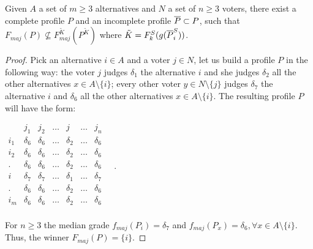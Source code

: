 \begin{proposition}
	\label{prop:notsamewinner}
	Given $A$ a set of $m\geq 3$ alternatives and $N$ a set of $n\geq3$ voters, there exist a complete profile $P$ and an incomplete profile $\overline{P} \subset P$, such that $F_{maj}(P) \nsubseteq F^{\tilde{K}}_{maj}(P^{\tilde{K}})$ \textemdash where $\tilde{K}=F^S_k(g(\overline{P}^S_i))$.
\end{proposition}
\begin{proof}
	Pick an alternative $i\in A$ and a voter $j \in N$, let us build a profile $P$ in the following way: the voter $j$ judges $\delta_1$ the alternative $i$ and she judges $\delta_2$ all the other alternatives $x \in A \setminus \{i\}$; every other voter $y\in N \setminus \{j\}$ judges $\delta_7$ the alternative $i$ and $\delta_6$ all the other alternatives $x \in A \setminus \{i\}$. The resulting profile $P$ will have the form:
	\begin{center}
		$
		\begin{array}{ccccccc}
			& j_1 & j_2 & \dots & j & \dots & j_n \\
			i_1 &	\delta_6 & \delta_6 & \dots & \delta_2 & \dots & \delta_6 \\
			i_2 &	\delta_6 & \delta_6 & \dots & \delta_2 & \dots & \delta_6 \\
			. &	\delta_6 & \delta_6 & \dots & \delta_2 & \dots & \delta_6 \\
			i &	\delta_7 & \delta_7 & \dots & \delta_1 & \dots & \delta_7 \\
			. &	\delta_6 & \delta_6 & \dots & \delta_2 & \dots & \delta_6 \\
			i_m &	\delta_6 & \delta_6 & \dots & \delta_2 & \dots & \delta_6 \\
		\end{array} \quad.
		$
	\end{center}
	For $n\geq 3$ the median grade $f_{maj}(P_i)=\delta_7$ and $f_{maj}(P_x)=\delta_6, \forall x \in A \setminus \{i\}$. Thus, the winner $F_{maj}(P)=\{i\}$.
	

\end{proof}
